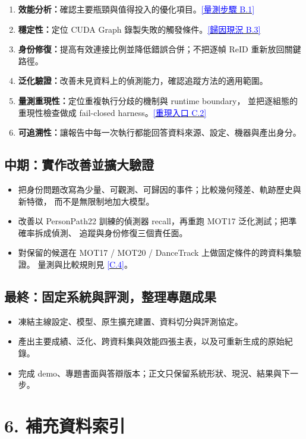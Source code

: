 \documentclass[10pt,a4paper]{ctexart}
\newcommand{\applink}[2]{\hyperref[#1]{\textcolor{Blue}{[#2]}}}
\begin{document}
\begin{enumerate}
  \item \textbf{效能分析：}確認主要瓶頸與值得投入的優化項目。\applink{app:B1}{量測步驟 B.1}
  \item \textbf{穩定性：}定位 CUDA Graph 錄製失敗的觸發條件。\applink{app:B3}{歸因現況 B.3}
  \item \textbf{身份修復：}提高有效連接比例並降低錯誤合併；不把逐幀 ReID 重新放回關鍵路徑。
  \item \textbf{泛化驗證：}改善未見資料上的偵測能力，確認追蹤方法的適用範圍。
  \item \textbf{量測重現性：}定位重複執行分歧的機制與 runtime boundary，
  並把逐組態的重現性檢查做成 fail-closed harness。\applink{app:C2}{重現入口 C.2}
  \item \textbf{可追溯性：}讓報告中每一次執行都能回答資料來源、設定、機器與產出身分。
\end{enumerate}

\subsection{中期：實作改善並擴大驗證}

\begin{itemize}
  \item 把身份問題改寫為少量、可觀測、可歸因的事件；比較幾何殘差、軌跡歷史與新特徵，
  而不是無限制地加大模型。
  \item 改善以 PersonPath22 訓練的偵測器 recall，再重跑 MOT17 泛化測試；把準確率拆成偵測、
  追蹤與身份修復三個責任面。
  \item 對保留的候選在 MOT17 / MOT20 / DanceTrack 上做固定條件的跨資料集驗證。
  量測與比較規則見 \applink{app:C4}{C.4}。
\end{itemize}

\subsection{最終：固定系統與評測，整理專題成果}

\begin{itemize}
  \item 凍結主線設定、模型、原生擴充建置、資料切分與評測協定。
  \item 產出主要成績、泛化、跨資料集與效能四張主表，以及可重新生成的原始紀錄。
  \item 完成 demo、專題書面與答辯版本；正文只保留系統形狀、現況、結果與下一步。
\end{itemize}

\section{6. 補充資料索引}
\end{document}
